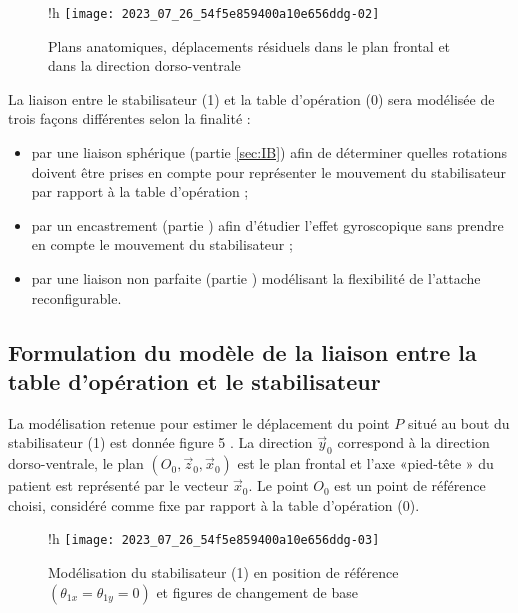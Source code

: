 \begin{figure}{!h}
\centering
\texttt{[image: 2023\_07\_26\_54f5e859400a10e656ddg-02]}
\caption{Plans anatomiques, déplacements résiduels dans le plan frontal et dans la direction dorso-ventrale\label{fig:04}}
\end{figure}



La liaison entre le stabilisateur (1) et la table d'opération (0) sera modélisée de trois façons différentes selon la finalité :

\begin{itemize}
  \item par une liaison sphérique (partie \ref{sec:IB}) afin de déterminer quelles rotations doivent être prises en compte pour représenter le mouvement du stabilisateur par rapport à la table d'opération ;
  \item par un encastrement (partie \label{sec:IIA}) afin d'étudier l'effet gyroscopique sans prendre en compte le mouvement du stabilisateur ;
  \item par une liaison non parfaite (partie \label{sec:IIC}) modélisant la flexibilité de l'attache reconfigurable.
\end{itemize}

\subsection{\label{sec:IB}Formulation du modèle de la liaison entre la table d'opération et le stabilisateur}
La modélisation retenue pour estimer le déplacement du point $P$ situé au bout du stabilisateur (1) est donnée figure 5 . La direction $\vec{y}_{0}$ correspond à la direction dorso-ventrale, le plan $\left(O_{0}, \vec{z}_{0}, \vec{x}_{0}\right)$ est le plan frontal et l'axe «pied-tête » du patient est représenté par le vecteur $\vec{x}_{0}$. Le point $O_{0}$ est un point de référence choisi, considéré comme fixe par rapport à la table d'opération (0).

\begin{figure}{!h}
\centering
\texttt{[image: 2023\_07\_26\_54f5e859400a10e656ddg-03]}
\caption{Modélisation du stabilisateur (1) en position de référence $\left(\theta_{1 x}=\theta_{1 y}=0\right)$ et figures de changement de base\label{fig:05}}
\end{figure}


